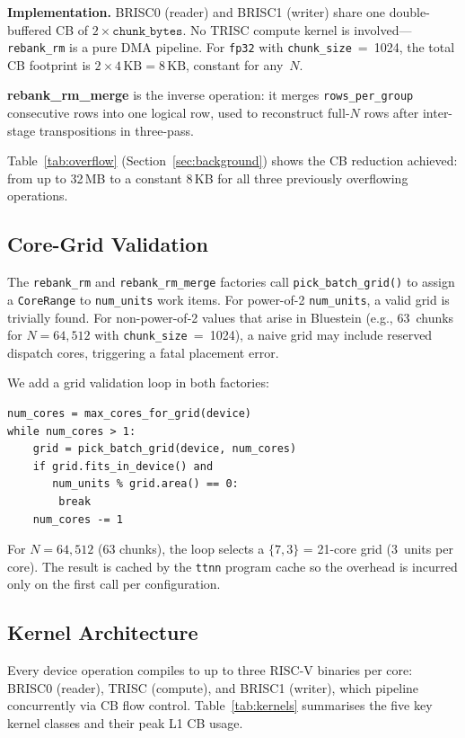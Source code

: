 \documentclass[conference]{IEEEtran}
\begin{document}
\textbf{Implementation.} BRISC0 (reader) and BRISC1 (writer) share one
double-buffered CB of $2 \times \texttt{chunk\_bytes}$. No TRISC compute kernel
is involved---\texttt{rebank\_rm} is a pure DMA pipeline. For \texttt{fp32} with
\texttt{chunk\_size}~=~1024, the total CB footprint is $2 \times 4\,\text{KB}
= 8\,\text{KB}$, constant for any~$N$.

\textbf{rebank\_rm\_merge} is the inverse operation: it merges
\texttt{rows\_per\_group} consecutive rows into one logical row, used to
reconstruct full-$N$ rows after inter-stage transpositions in three-pass.

Table~\ref{tab:overflow} (Section~\ref{sec:background}) shows the CB reduction
achieved: from up to 32\,MB to a constant 8\,KB for all three previously
overflowing operations.

\subsection{Core-Grid Validation}

The \texttt{rebank\_rm} and \texttt{rebank\_rm\_merge} factories call
\texttt{pick\_batch\_grid()} to assign a \texttt{CoreRange} to
\texttt{num\_units} work items. For power-of-2 \texttt{num\_units}, a valid grid
is trivially found. For non-power-of-2 values that arise in Bluestein (e.g.,
63~chunks for $N = 64{,}512$ with \texttt{chunk\_size}~=~1024), a naive grid may
include reserved dispatch cores, triggering a fatal placement error.

We add a grid validation loop in both factories:
\begin{lstlisting}
num_cores = max_cores_for_grid(device)
while num_cores > 1:
    grid = pick_batch_grid(device, num_cores)
    if grid.fits_in_device() and
       num_units % grid.area() == 0:
        break
    num_cores -= 1
\end{lstlisting}

For $N = 64{,}512$ (63 chunks), the loop selects a $\{7,3\}$ = 21-core grid
(3~units per core). The result is cached by the \texttt{ttnn} program cache so
the overhead is incurred only on the first call per configuration.

\subsection{Kernel Architecture}

Every device operation compiles to up to three RISC-V binaries per core:
BRISC0 (reader), TRISC (compute), and BRISC1 (writer), which pipeline
concurrently via CB flow control. Table~\ref{tab:kernels} summarises the five
key kernel classes and their peak L1 CB usage.
\end{document}
